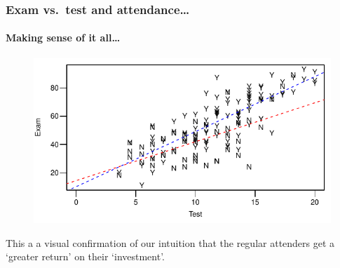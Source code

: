 \documentclass{beamer}\usepackage[]{graphicx}\usepackage[]{xcolor}
\begin{document}
\begin{frame}[fragile]
\frametitle{Exam vs.\ test \textbf{and} attendance\ldots}
\framesubtitle{Making sense of it all\ldots}


\begin{figure}
  \centering
  \includegraphics{figure/RC-H08-026}
\end{figure}

This a a visual confirmation of our intuition that the regular attenders get a `greater return' on their  `investment'.

\end{frame}
\end{document}
